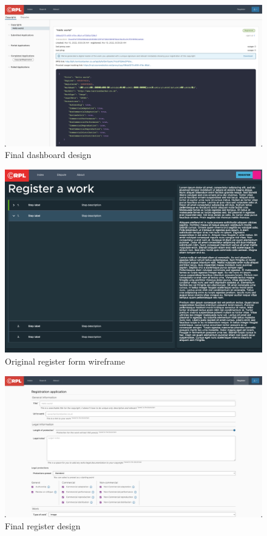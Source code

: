 \begin{figure}[H]
\caption{Final dashboard design}
\centering
\includegraphics[width=\textwidth,height=0.5\textheight,keepaspectratio]{images/wireframe/dashboard-real}
\end{figure}

\begin{figure}[H]
\caption{Original register form wireframe}
\centering
\includegraphics[width=\textwidth,height=0.5\textheight,keepaspectratio]{images/wireframe/Register}
\end{figure}

\begin{figure}[H]
\caption{Final register design}
\centering
\includegraphics[width=\textwidth,height=0.5\textheight,keepaspectratio]{images/wireframe/register-real}
\end{figure}


